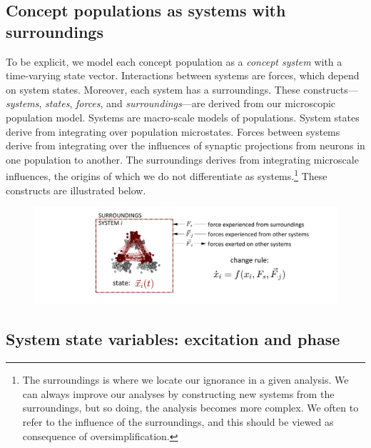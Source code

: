 \subsection{{\textbf{Concept populations as systems with surroundings}}} 

To be explicit, we model each concept population as a \textit{concept system} with a time-varying state vector. Interactions between systems are forces, which depend on system states. Moreover, each system has a surroundings. These constructs—\textit{systems}, \textit{states}, \textit{forces}, and \textit{surroundings}—are derived from our microscopic population model. Systems are macro-scale models of populations. System states derive from integrating over population microstates. Forces between systems derive from integrating over the influences of synaptic projections from neurons in one population to another. The surroundings derives from integrating microscale influences, the origins of which we do not differentiate as systems.\footnote{The surroundings is where we locate our ignorance in a given analysis. We can always improve our analyses by constructing new systems from the surroundings, but so doing, the analysis becomes more complex. We often to refer to the influence of the surroundings, and this should be viewed as consequence of oversimplification.} These constructs are illustrated below.

  
\begin{figure}
\includegraphics[width=\textwidth]{figures/Tilsen-img11.png}
\caption{\missingcaption}
\label{fig:}
\end{figure}
 

\subsection{System state variables: excitation and phase}

